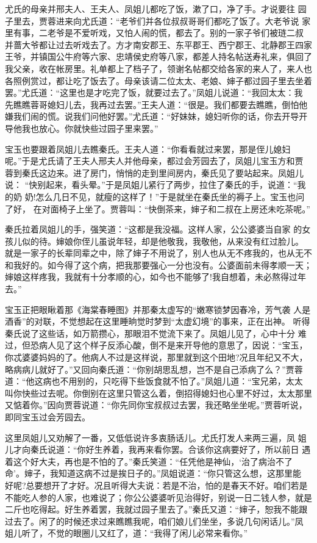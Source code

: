 尤氏的母亲并邢夫人、王夫人、凤姐儿都吃了饭，漱了口，净了手。才说要往
园子里去，贾蓉进来向尤氏道：“老爷们并各位叔叔哥哥们都吃了饭了。大老爷说
家里有事，二老爷是不爱听戏，又怕人闹的慌，都去了。别的一家子爷们被琏二叔
并蔷大爷都让过去听戏去了。方才南安郡王、东平郡王、西宁郡王、北静郡王四家
王爷，并镇国公牛府等六家、忠靖侯史府等八家，都差人持名帖送寿礼来，俱回了
我父亲，收在帐房里。礼单都上了档子了，领谢名帖都交给各家的来人了，来人也
各照例赏过，都让吃了饭去了。母亲该请二位太太、老娘、婶子都过园子里去坐着
罢。”尤氏道：“这里也是才吃完了饭，就要过去了。”凤姐儿说道：“我回太太：我
先瞧瞧蓉哥媳妇儿去，我再过去罢。”王夫人道：“很是。我们都要去瞧瞧，倒怕他
嫌我们闹的慌。说我们问他好罢。”尤氏道：“好妹妹，媳妇听你的话，你去开导开
导他我也放心。你就快些过园子里来罢。”

宝玉也要跟着凤姐儿去瞧秦氏。王夫人道：“你看看就过来罢，那是侄儿媳妇
呢。”于是尤氏请了王夫人邢夫人并他母亲，都过会芳园去了，凤姐儿宝玉方和贾
蓉到秦氏这边来。进了房门，悄悄的走到里间房内，秦氏见了要站起来。凤姐儿说：
“快别起来，看头晕。”于是凤姐儿紧行了两步，拉住了秦氏的手，说道：“我的奶
奶!怎么几日不见，就瘦的这样了！”于是就坐在秦氏坐的褥子上。宝玉也问了好，
在对面椅子上坐了。贾蓉叫：“快倒茶来，婶子和二叔在上房还未吃茶呢。”

秦氏拉着凤姐儿的手，强笑道：“这都是我没福。这样人家，公公婆婆当自家
的女孩儿似的待。婶娘你侄儿虽说年轻，却是他敬我，我敬他，从来没有红过脸儿。
就是一家子的长辈同辈之中，除了婶子不用说了，别人也从无不疼我的，也从无不
和我好的。如今得了这个病，把我那要强心一分也没有。公婆面前未得孝顺一天；
婶娘这样疼我，我就有十分孝顺的心，如今也不能够了!我自想着，未必熬得过年
去。”

宝玉正把眼瞅着那《海棠春睡图》并那秦太虚写的“嫩寒锁梦因春冷，芳气袭
人是酒香”的对联，不觉想起在这里睡晌觉时梦到“太虚幻境”的事来，正在出神。
听得秦氏说了这些话，如万箭攒心，那眼泪不觉流下来了。凤姐儿见了，心中十分
难过，但恐病人见了这个样子反添心酸，倒不是来开导他的意思了，因说：“宝玉，
你忒婆婆妈妈的了。他病人不过是这样说，那里就到这个田地?况且年纪又不大，
略病病儿就好了。”又回向秦氏道：“你别胡思乱想，岂不是自己添病了么？”贾蓉
道：“他这病也不用别的，只吃得下些饭食就不怕了。”凤姐儿道：“宝兄弟，太太
叫你快些过去呢。你倒别在这里只管这么着，倒招得媳妇也心里不好过，太太那里
又惦着你。”因向贾蓉说道：“你先同你宝叔叔过去罢，我还略坐坐呢。”贾蓉听说，
即同宝玉过会芳园去。

这里凤姐儿又劝解了一番，又低低说许多衷肠话儿。尤氏打发人来两三遍，凤
姐儿才向秦氏说道：“你好生养着，我再来看你罢。合该你这病要好了，所以前日
遇着这个好大夫，再也是不怕的了。”秦氏笑道：“任凭他是神仙，‘治了病治不了
命’。婶子，我知道这病不过是挨日子的。”凤姐说道：“你只管这么想，这那里能
好呢?总要想开了才好。况且听得大夫说：若是不治，怕的是春天不好。咱们若是
不能吃人参的人家，也难说了；你公公婆婆听见治得好，别说一日二钱人参，就是
二斤也吃得起。好生养着罢，我就过园子里去了。”秦氏又道：“婶子，恕我不能跟
过去了。闲了的时候还求过来瞧瞧我呢，咱们娘儿们坐坐，多说几句闲话儿。”凤
姐儿听了，不觉的眼圈儿又红了，道：“我得了闲儿必常来看你。”

